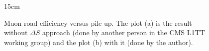 \begin{figure}[htbp]{15cm}
	\caption{Muon road efficiency versus pile up. The plot (a) is the result without $\Delta S$ approach (done by another person in the CMS L1TT working group) and the plot (b) with it (done by the author).}
	\centering
	\label{fig:deltaS_on_pile_up}
\end{figure}


